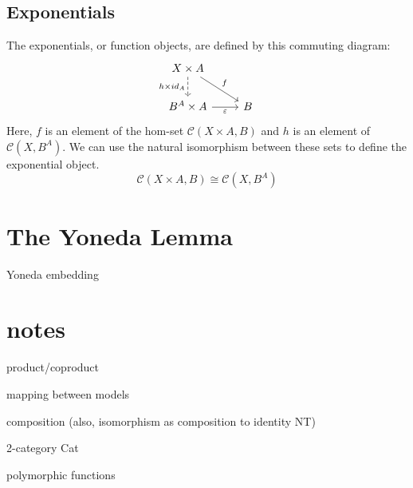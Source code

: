 \documentclass[DaoFP]{subfiles}
\begin{document}
\subsection{Exponentials}

The exponentials, or function objects, are defined by this commuting diagram:
\[
 \begin{tikzcd}
 X \times A
 \arrow[d, dashed, "h \times id_A"']
 \arrow[rd, "f"]
 \\
 B^A \times A
 \arrow[r, "\varepsilon"']
& B
 \end{tikzcd}
\]
Here, $f$ is an element of the hom-set $\mathcal{C}(X \times A, B)$ and $h$ is an element of $\mathcal{C}(X, B^A)$. We can use the natural isomorphism between these sets to define the exponential object. 
\[\mathcal{C}(X \times A, B) \cong \mathcal{C}(X, B^A)\]


\section{The Yoneda Lemma}

Yoneda embedding


\section{notes}

product/coproduct

mapping between models

composition (also, isomorphism as composition to identity NT)

2-category Cat

polymorphic functions

\begin{exercise}
\end{exercise}
\begin{haskell}
\end{haskell}
\[
 \begin{tikzcd}
  \end{tikzcd}
\]
\end{document}
